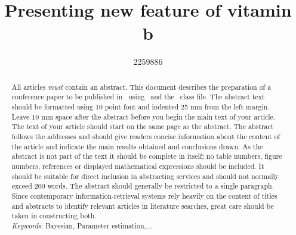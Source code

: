 \documentclass[a4paper]{jpconf}
\begin{document}
\title{Presenting new feature of vitamin b}

\author{2259886}

\address{School of Physics and Astronomy, University of Glasgow, UK}


\begin{abstract}
All articles {\it must} contain an abstract. This document describes the  preparation of a conference paper to be published in \jpcs\ using \LaTeXe\ and the \cls\ class file. The abstract text should be formatted using 10 point font and indented 25 mm from the left margin. Leave 10 mm space after the abstract before you begin the main text of your article. The text of your article should start on the same page as the abstract. The abstract follows the addresses and should give readers concise information about the content of the article and indicate the main results obtained and conclusions drawn. As the abstract is not part of the text it should be complete in itself; no table numbers, figure numbers, references or displayed mathematical expressions should be included. It should be suitable for direct inclusion in abstracting services and should not normally exceed 200 words. The abstract should generally be restricted to a single paragraph. Since contemporary information-retrieval systems rely heavily on the content of titles and abstracts to identify relevant articles in literature searches, great care should be taken in constructing both.\\
\textit{Keywords}: Bayesian, Parameter estimation,...

\end{abstract}
\end{document}
